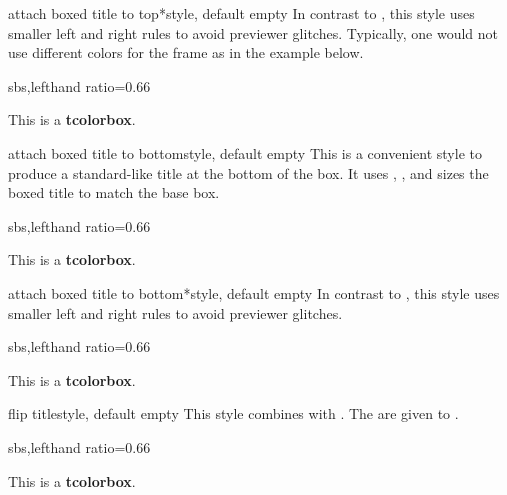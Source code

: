 \begin{docTcbKey}[][doc new=2016-02-26]{attach boxed title to top*}{}{style, default empty}
  In contrast to , this style
  uses smaller left and right rules to avoid previewer glitches.
  Typically, one would not use different colors for the frame as in the
  example below.
\begin{dispExample*}{sbs,lefthand ratio=0.66}
\begin{tcolorbox}[enhanced,title=My title,
  attach boxed title to top*,
  boxed title style={colframe=red}]
  This is a \textbf{tcolorbox}.
\end{tcolorbox}
\end{dispExample*}
\end{docTcbKey}

\begin{docTcbKey}[][doc new=2016-02-26]{attach boxed title to bottom}{}{style, default empty}
  This is a convenient style to produce a standard-like title at the bottom
  of the box.
  It uses ,
  , and sizes the boxed title to match
  the base box.
\begin{dispExample*}{sbs,lefthand ratio=0.66}
\begin{tcolorbox}[enhanced,title=My title,
  attach boxed title to bottom,
  boxed title style={colframe=red}]
  This is a \textbf{tcolorbox}.
\end{tcolorbox}
\end{dispExample*}
\end{docTcbKey}

\begin{docTcbKey}[][doc new=2016-02-26]{attach boxed title to bottom*}{}{style, default empty}
  In contrast to , this style
  uses smaller left and right rules to avoid previewer glitches.
\begin{dispExample*}{sbs,lefthand ratio=0.66}
\begin{tcolorbox}[enhanced,title=My title,
  attach boxed title to bottom*]
  This is a \textbf{tcolorbox}.
\end{tcolorbox}
\end{dispExample*}
\end{docTcbKey}

\begin{docTcbKey}[][doc new=2016-02-26]{flip title}{}{style, default empty}
  This style combines 
  with . The  are given to
  .
\begin{dispExample*}{sbs,lefthand ratio=0.66}
\begin{tcolorbox}[tile,flip title={sharp corners},
  title=My title,colback=red!10,
  colbacktitle=red!75!black]
  This is a \textbf{tcolorbox}.
\end{tcolorbox}
\end{dispExample*}
\end{docTcbKey}

